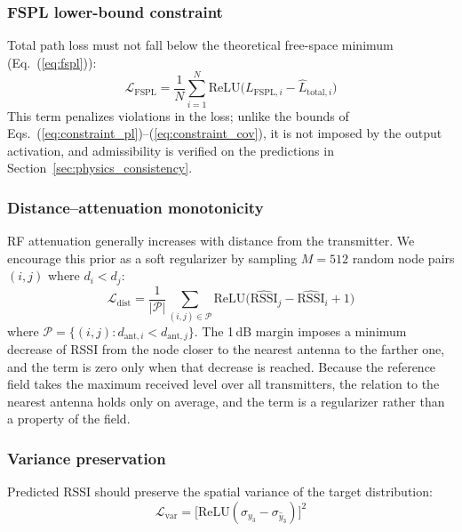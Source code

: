 \documentclass{ieeeaccess}
\begin{document}
\subsubsection{FSPL lower-bound constraint}

Total path loss must not fall below the theoretical free-space minimum (Eq.~(\ref{eq:fspl})):
\begin{equation}
\mathcal{L}_{\text{FSPL}} = \frac{1}{N} \sum_{i=1}^{N} \mathrm{ReLU}\!\bigl(L_{\text{FSPL},i} - \hat{L}_{\text{total},i}\bigr)
\label{eq:loss_fspl}
\end{equation}
This term penalizes violations in the loss; unlike the bounds of Eqs.~(\ref{eq:constraint_pl})--(\ref{eq:constraint_cov}), it is not imposed by the output activation, and admissibility is verified on the predictions in Section~\ref{sec:physics_consistency}.

\subsubsection{Distance--attenuation monotonicity}

RF attenuation generally increases with distance from the transmitter. We encourage this prior as a soft regularizer by sampling $M{=}512$ random node pairs $(i,j)$ where $d_i < d_j$:
\begin{equation}
\mathcal{L}_{\text{dist}} = \frac{1}{|\mathcal{P}|} \sum_{(i,j) \in \mathcal{P}} \mathrm{ReLU}\!\bigl(\widehat{\text{RSSI}}_j - \widehat{\text{RSSI}}_i + 1\bigr)
\label{eq:loss_dist}
\end{equation}
where $\mathcal{P} = \{(i,j) : d_{\text{ant},i} < d_{\text{ant},j}\}$. The 1\,dB margin imposes a minimum decrease of RSSI from the node closer to the nearest antenna to the farther one, and the term is zero only when that decrease is reached. Because the reference field takes the maximum received level over all transmitters, the relation to the nearest antenna holds only on average, and the term is a regularizer rather than a property of the field.

\subsubsection{Variance preservation}

Predicted RSSI should preserve the spatial variance of the target distribution:
\begin{equation}
\mathcal{L}_{\text{var}} = \bigl[\mathrm{ReLU}(\sigma_{y_3} - \sigma_{\hat{y}_3})\bigr]^2
\label{eq:loss_var}
\end{equation}
\end{document}
